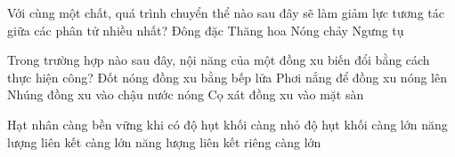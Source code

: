 	\begin{ex}%
		Với cùng một chất, quá trình chuyển thể nào sau đây sẽ làm giảm lực tương tác giữa các phân tử nhiều nhất?
		\choice
		{Đông đặc}
		{\True Thăng hoa}
		{Nóng chảy}
		{Ngưng tụ}
	\end{ex}

	\begin{ex}%
		Trong trường hợp nào sau đây, nội năng của một đồng xu biến đổi bằng cách thực hiện công?
		\choice
		{Đốt nóng đồng xu bằng bếp lửa}
		{Phơi nắng để đồng xu nóng lên}
		{Nhúng đồng xu vào chậu nước nóng}
		{\True Cọ xát đồng xu vào mặt sàn}
	\end{ex}

	\begin{ex}%
		Hạt nhân càng bền vững khi có
		\choice
		{độ hụt khối càng nhỏ}
		{độ hụt khối càng lớn}
		{năng lượng liên kết càng lớn}
		{\True năng lượng liên kết riêng càng lớn}
	\end{ex}

